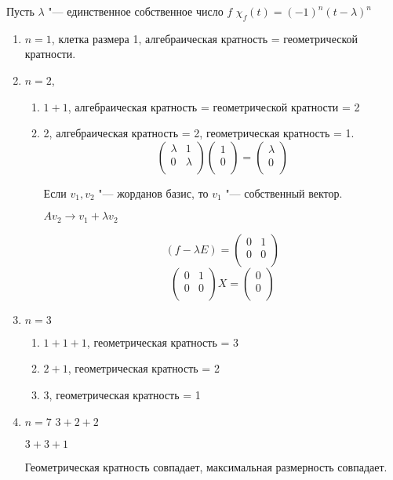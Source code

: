\begin{exmp}
Пусть $\lambda$ "--- единственное собственное число $f$ $\chi_f(t) = (-1)^{n}(t - \lambda)^n$
\begin{enumerate}
\item $n = 1$, клетка размера 1, алгебраическая кратность  = геометрической кратности.
\item $n = 2$, 
\begin{enumerate}
\item $1 + 1$, алгебраическая кратность  = геометрической кратности = 2
\item 2, алгебраическая кратность = 2, геометрическая кратность = 1.
$$
\begin{pmatrix}
\lambda & 1\\
0&\lambda\\
\end{pmatrix} \begin{pmatrix}
1\\
0\\
\end{pmatrix}
= \begin{pmatrix}
\lambda\\
0\\
\end{pmatrix}
$$

Если $v_1, v_2$ "--- жорданов базис, то $v_1$ "--- собственный вектор.

$A v_2 \to v_1 + \lambda v_2$

$$(f - \lambda E) = \begin{pmatrix}
0&1\\
0&0\\
\end{pmatrix}$$
$$
\begin{pmatrix}
0&1\\
0&0\\
\end{pmatrix} X = \begin{pmatrix}
0\\
0\\
\end{pmatrix}
$$
\end{enumerate}

\item $n = 3$
\begin{enumerate}
\item $1 + 1 + 1$, геометрическая кратность = 3
\item $2 + 1$, геометрическая кратность = 2
\item 3, геометрическая кратность = 1
\end{enumerate}

\item $n = 7$
$3 + 2 + 2$

$3 + 3 + 1$

Геометрическая кратность совпадает, максимальная размерность совпадает.
\end{enumerate}
\end{exmp}

